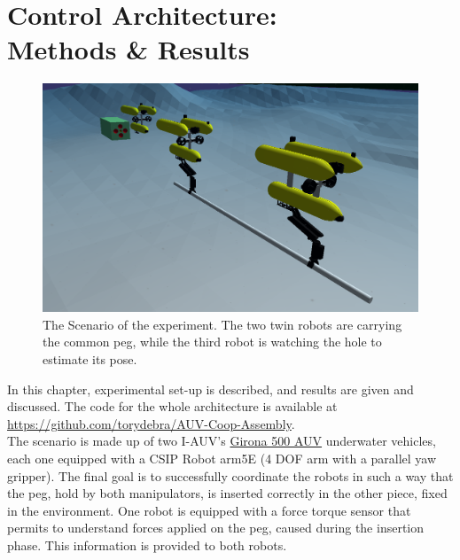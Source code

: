 

\chapter[Control Architecture: Methods \& Results]{Control Architecture: \\ Methods \& Results}
\label{chap:method}
\ifpdf
    \graphicspath{{Method/Figures/PNG/}{Method/Figures/PDF/}{Method/Figures/}}
\else
    \graphicspath{{Method/Figures/EPS/}{Method/Figures/}}
\fi

\begin{figure}[H]
	\centering
	\includegraphics[width=14.5cm]{scenario_whole.png}
	\caption[The Scenario with the two robot carrying the peg and the vision robot watching the hole]{The Scenario of the experiment. The two twin robots are carrying the common peg, while the third robot is watching the hole to estimate its pose.}
	\label{fig:method_uwsim}
\end{figure}

In this chapter, experimental set-up is described, and results are given and discussed. The code for the whole architecture is available at \href{https://github.com/torydebra/AUV-Coop-Assembly}{https://github.com/torydebra/AUV-Coop-Assembly}.\\

The scenario is made up of two I-AUV's \href{https://cirs.udg.edu/auvs-technology/auvs/girona-500-auv/}{Girona 500 AUV} underwater vehicles, each one equipped with a CSIP Robot arm5E (4 DOF arm with a parallel yaw gripper). The final goal is to successfully coordinate the robots in such a way that the peg, hold by both manipulators, is inserted correctly in the other piece, fixed in the environment. One robot is equipped with a force torque sensor that permits to understand forces applied on the peg, caused during the insertion phase. This information is provided to both robots.

